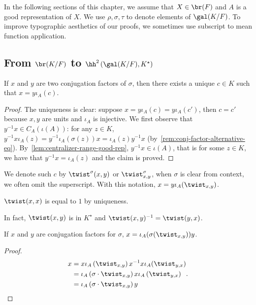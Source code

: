 In the following sections of this chapter, we assume that $X \in\br(F)$ and $A$ is a good representation of $X$. We use $\rho, \sigma, \tau$ to denote elements of $\gal(K/F)$. To improve typographic aesthetics of our proofs, we sometimes use subscript to mean function application.


\subsection{From $\br(K/F)$ to $\hh^{2}\left(\gal(K/F),K^{\star}\right)$}

\begin{lemma}\label{lem:twist-spec1}
  If $x$ and $y$ are two conjugation factors of $\sigma$, then there exists a unique $c \in K$ such that $x = y\iota_{A}(c)$.
  \leanok
\end{lemma}

\begin{proof}
  The uniqueness is clear: suppose $x = y\iota_{A}(c)=y\iota_{A}(c')$, then $c = c'$ because $x, y$ are units and $\iota_{A}$ is injective. We first observe that $y^{-1}x\in C_{A}(\iota(A))$: for any $z \in K$, $y^{-1}x\iota_{A}(z)=y^{-1}\iota_{A}(\sigma(z))x=\iota_{A}(z)y^{-1}x$ (by~\cref{rem:conj-factor-alternative-eq}). By~\cref{lem:centralizer-range-good-rep}, $y^{-1}x\in \iota(A)$, that is for some $z \in K$, we have that $y^{-1}x = \iota_{A}(z)$ and the claim is proved.
\end{proof}

We denote such $c$ by $\twist^{\sigma}(x, y)$ or $\twist^{\sigma}_{x, y}$, when $\sigma$ is clear from context, we often omit the superscript. With this notation, $x = y\iota_{A}(\twist_{x,y})$.

\begin{remark}
  $\twist(x, x)$ is equal to $1$ by uniqueness.
\end{remark}

\begin{remark}
  In fact, $\twist(x, y)$ is in $K^{\star}$ and $\twist(x, y)^{-1}=\twist(y, x)$.
\end{remark}

\begin{lemma}\label{lem:twist-spec2}
  If $x$ and $y$ are conjugation factors for $\sigma$, $x=\iota_{A}(\sigma(\twist_{x, y}))y$.
  \leanok
\end{lemma}
\begin{proof}
  \[
    \begin{aligned}
      x &= x \iota_{A}\left(\twist_{x,y}\right) x^{-1} x \iota_{A}(\twist_{y,x}) \\
        &= \iota_{A}\left(\sigma\cdot\twist_{x,y}\right)x\iota_{A}\left(
          \twist_{y,x}\right)\\
      &=\iota_{A}\left(\sigma\cdot \twist_{x,y}\right)y
    \end{aligned}.
  \]
\end{proof}

